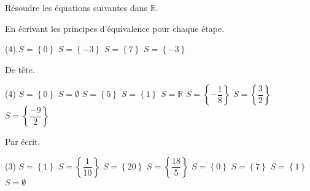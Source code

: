 \documentclass[a4paper,12pt]{report}
\begin{document}
\vspace{5pt}

Résoudre les équations suivantes dans $\mathbb{R}$.

En écrivant les principes d'équivalence pour chaque étape.
	\begin{tasks}(4)
		\task $S=\left\{0\right\}$
		\task $S=\left\{-3\right\}$
		\task $S=\left\{7\right\}$
		\task $S=\left\{-3\right\}$
\end{tasks}
De tête.
\begin{tasks}(4)
	\task $S=\left\{0\right\}$
\task $S=\emptyset$
\task $S=\left\{5\right\}$
\task $S=\left\{1\right\}$
\task $S=\mathbb{R}$
\task $S=\left\{-\dfrac{1}{8}\right\}$
\task $S=\left\{\dfrac{3}{2}\right\}$
\task $S=\left\{\dfrac{-9}{2}\right\}$
\end{tasks}

Par écrit.
	\begin{tasks}(3)
		\task $S=\left\{1\right\}$
		\task $S=\left\{\dfrac{1}{10}\right\}$
			\task $S=\left\{20\right\}$
			\task $S=\left\{\dfrac{18}{5}\right\}$
			\task $S=\left\{0\right\}$
			\task $S=\left\{7\right\}$
			\task $S=\left\{1\right\}$
\task $S=\emptyset$
	\end{tasks}
	
\end{document}
